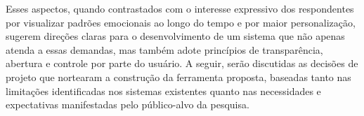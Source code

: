 Esses aspectos, quando contrastados com o interesse expressivo dos respondentes
por visualizar padrões emocionais ao longo do tempo e por maior personalização,
sugerem direções claras para o desenvolvimento de um sistema que não apenas
atenda a essas demandas, mas também adote princípios de transparência, abertura
e controle por parte do usuário. A seguir, serão discutidas as decisões de
projeto que nortearam a construção da ferramenta proposta, baseadas tanto nas
limitações identificadas nos sistemas existentes quanto nas necessidades e
expectativas manifestadas pelo público-alvo da pesquisa.
